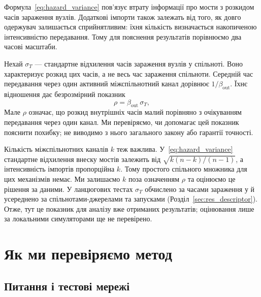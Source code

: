 Формула~\eqref{eq:hazard_variance} пов'язує втрату інформації про мости з розкидом часів зараження вузлів. Додаткові імпорти також залежать від того, як довго одержувач залишається сприйнятливим: їхня кількість визначається накопиченою інтенсивністю передавання. Тому для пояснення результатів порівнюємо два часові масштаби.
\par Нехай $\sigma_T$ --- стандартне відхилення часів зараження вузлів у спільноті. Воно характеризує розкид цих часів, а не весь час зараження спільноти. Середній час передавання через один активний міжспільнотний канал дорівнює $1/\beta_{\mathrm{out}}$. Їхнє відношення дає безрозмірний показник
\begin{equation}
\label{eq:rho}
\rho=\beta_{\mathrm{out}}\,\sigma_T,
\end{equation}
Мале $\rho$ означає, що розкид внутрішніх часів малий порівняно з очікуванням передавання через один канал. Ми перевіряємо, чи допомагає цей показник пояснити похибку; не виводимо з нього загального закону або гарантії точності.
\par Кількість міжспільнотних каналів $k$ теж важлива. У~\eqref{eq:hazard_variance} стандартне відхилення внеску мостів залежить від $\sqrt{k(n-k)/(n-1)}$, а інтенсивність імпортів пропорційна $k$. Тому простого спільного множника для цих механізмів немає. Ми залишаємо $k$ поза означенням $\rho$ та оцінюємо це рішення за даними. У ланцюгових тестах $\sigma_T$ обчислено за часами зараження у \Full{} й усереднено за спільнотами-джерелами та запусками (Розділ~\ref{sec:res_descriptor}). Отже, тут це показник для аналізу вже отриманих результатів; оцінювання лише за локальними симуляторами ще не перевірено.

\section{Як ми перевіряємо метод}
\label{sec:design}

\subsection{Питання і тестові мережі}

